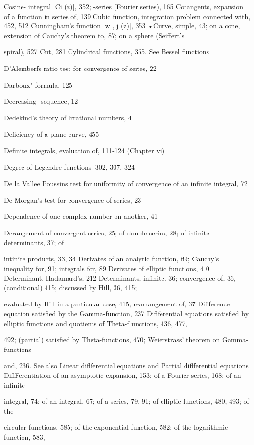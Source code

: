 Cosine- integral [Ci (z)], 352; -series (Fourier series), 165
Cotangents, expansion of a function in series of, 139
Cubic function, integration problem connected with, 452, 512
Cunningham's function [w ,  j (z)], 353
•Curve, simple, 43; on a cone, extension of Cauchy's theorem to, 87; on a sphere (Seiffert's

spiral), 527
Cut, 281
Cylindrical functions, 355. See Bessel functions

%
%
D'Alemberfs ratio test for convergence of series, 22

Darboux" formula. 125

Decreasing- sequence, 12

Dedekind's theory of irrational numbers, 4

Deficiency of a plane curve, 455

Definite integrals, evaluation of, 111-124 (Chapter vi)

Degree of Legendre functions, 302, 307, 324

De la Vallee Poussins test for uniformity of convergence of an infinite integral, 72

De Morgan's test for convergence of series, 23

Dependence of one complex number on another, 41

Derangement of convergent series, 25; of double series, 28; of infinite determinants, 37; of

intinite products, 33, 34
Derivates of an analytic function, fi9; Cauchy's inequality for, 91; integrals for, 89
Derivates of elliptic functions, 4 0
Determinant. Hadamard's, 212
Determinants, infinite, 36; convergence of, 36, (conditional) 415; discussed by Hill, 36, 415;

evaluated by Hill in a particular case, 415; rearrangement of, 37
Difiference equation satisfied by the Gamma-function, 237
Diflferential equations satisfied by elliptic functions and quotients of Theta-f unctions, 436, 477,

492; (partial) satisfied by Theta-functions, 470; Weierstrass' theorem on Gamma-functions

and, 236. See also Linear diflferential equations and Partial diflferential equations
DiflFerentiation of an asymptotic expansion, 153; of a Fourier series, 168; of an infinite

integral, 74; of an integral, 67; of a series, 79, 91; of elliptic functions, 480, 493; of the

circular functions, 585; of the exponential function, 582; of the logarithmic function, 583,

